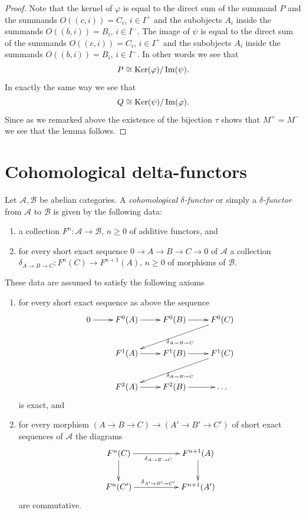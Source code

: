 \begin{proof}
\medskip\noindent
Note that the kernel of $\varphi$ is equal to the direct sum of the
summand $P$ and the summands $O((c, i)) = C_i$, $i \in I^{+}$ and
the subobjects $A_i$ inside the summands $O((b, i)) = B_i$, $i \in I^{-}$.
The image of $\psi$ is equal to the direct sum of the
summands $O((c, i)) = C_i$, $i \in I^{+}$ and
the subobjects $A_i$ inside the summands $O((b, i)) = B_i$, $i \in I^{-}$.
In other words we see that
$$
P \cong \mathop{\mathrm{Ker}}(\varphi)/\mathop{\mathrm{Im}}(\psi).
$$
In exactly the same way we see that
$$
Q \cong \mathop{\mathrm{Ker}}(\psi)/\mathop{\mathrm{Im}}(\varphi).
$$
Since as we remarked above the existence of the bijection
$\tau$ shows that $M^{+} = M^{-}$ we see that the lemma follows.
\end{proof}






\section{Cohomological delta-functors}
\label{section-cohomological-delta-functor}

\begin{definition}
\label{definition-cohomological-delta-functor}
Let $\mathcal{A}, \mathcal{B}$ be abelian categories.
A {\it cohomological $\delta$-functor} or simply a
{\it $\delta$-functor} from $\mathcal{A}$
to $\mathcal{B}$ is given by the following data:
\begin{enumerate}
\item a collection $F^n : \mathcal{A} \to \mathcal{B}$, $n \geq 0$ of additive
functors, and
\item for every short exact sequence $0 \to A \to B \to C \to 0$
of $\mathcal{A}$
a collection $\delta_{A \to B \to C} : F^n(C) \to F^{n + 1}(A)$, $n \geq 0$
of morphisms of $\mathcal{B}$.
\end{enumerate}
These data are assumed to satisfy the following axioms
\begin{enumerate}
\item for every short exact sequence as above the sequence
$$
\xymatrix{
0 \ar[r] &
F^0(A) \ar[r] &
F^0(B) \ar[r] &
F^0(C) \ar[lld]^{\delta_{A \to B \to C}} \\
 &
F^1(A) \ar[r] &
F^1(B) \ar[r] &
F^1(C) \ar[lld]^{\delta_{A \to B \to C}} \\
 &
F^2(A) \ar[r] &
F^2(B) \ar[r] &
\ldots
}
$$
is exact, and
\item for every morphism $(A \to B \to C) \to (A' \to B' \to C')$
of short exact sequences of $\mathcal{A}$ the diagrams
$$
\xymatrix{
F^n(C) \ar[d] \ar[rr]_{\delta_{A \to B \to C}} & & F^{n + 1}(A) \ar[d] \\
F^n(C') \ar[rr]^{\delta_{A' \to B' \to C'}} & & F^{n + 1}(A')
}
$$
are commutative.
\end{enumerate}
\end{definition}

